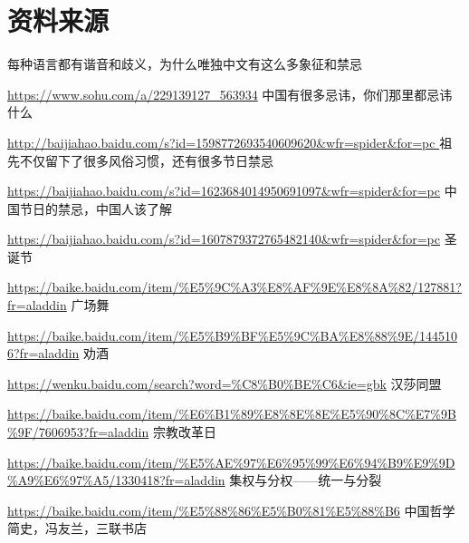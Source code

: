 \chapter{资料来源}
\setlength\parindent{0em}
\cnprolight
\mypar
每种语言都有谐音和歧义，为什么唯独中文有这么多象征和禁忌 

\url{https://www.sohu.com/a/229139127_563934} 
\mypar
中国有很多忌讳，你们那里都忌讳什么 

\url{http://baijiahao.baidu.com/s?id=1598772693540609620&wfr=spider&for=pc }
\mypar
祖先不仅留下了很多风俗习惯，还有很多节日禁忌 

\url{https://baijiahao.baidu.com/s?id=1623684014950691097&wfr=spider&for=pc} 
\mypar
中国节日的禁忌，中国人该了解 

\url{https://baijiahao.baidu.com/s?id=1607879372765482140&wfr=spider&for=pc}
\mypar
圣诞节

\url{https://baike.baidu.com/item/%E5%9C%A3%E8%AF%9E%E8%8A%82/127881?fr=aladdin}
\mypar
广场舞

\url{https://baike.baidu.com/item/%E5%B9%BF%E5%9C%BA%E8%88%9E/1445106?fr=aladdin}
\mypar
劝酒

\url{https://wenku.baidu.com/search?word=%C8%B0%BE%C6&ie=gbk}
\mypar
汉莎同盟

\url{https://baike.baidu.com/item/%E6%B1%89%E8%8E%8E%E5%90%8C%E7%9B%9F/7606953?fr=aladdin}
\mypar
宗教改革日

\url{https://baike.baidu.com/item/%E5%AE%97%E6%95%99%E6%94%B9%E9%9D%A9%E6%97%A5/1330418?fr=aladdin}
\mypar
集权与分权——统一与分裂

\url{https://baike.baidu.com/item/%E5%88%86%E5%B0%81%E5%88%B6}
\mypar
中国哲学简史，冯友兰，三联书店
